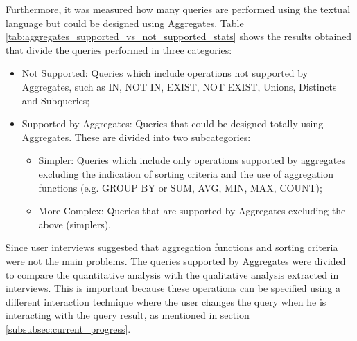 Furthermore, it was measured how many queries are performed using the textual language but could be designed using Aggregates. Table \ref{tab:aggregates_supported_vs_not_supported_stats} shows the results obtained that divide the queries performed in three categories:

\begin{itemize}
    \item Not Supported: Queries which include operations not supported by Aggregates, such as IN, NOT IN, EXIST, NOT EXIST, Unions, Distincts and Subqueries;
    \item Supported by Aggregates: Queries that could be designed totally using Aggregates. These are divided into two subcategories:
    \begin{itemize}
        \item Simpler: Queries which include only operations supported by aggregates excluding the indication of sorting criteria and the use of aggregation functions (e.g. GROUP BY or SUM, AVG, MIN, MAX, COUNT);
        \item More Complex: Queries that are supported by Aggregates excluding the above (simplers).
    \end{itemize}
\end{itemize}

Since user interviews suggested that aggregation functions and sorting criteria were not the main problems. The queries supported by Aggregates were divided to compare the quantitative analysis with the qualitative analysis extracted in interviews. This is important because these operations can be specified using a different interaction technique where the user changes the query when he is interacting with the query result, as mentioned in section \ref{subsubsec:current_progress}. 

\begin{table}[tb]
	\caption{Queries that could be designed using Aggregates and the queries which the tool does not support}
	\label{tab:aggregates_supported_vs_not_supported_stats}
\centering
{}
\end{table}


